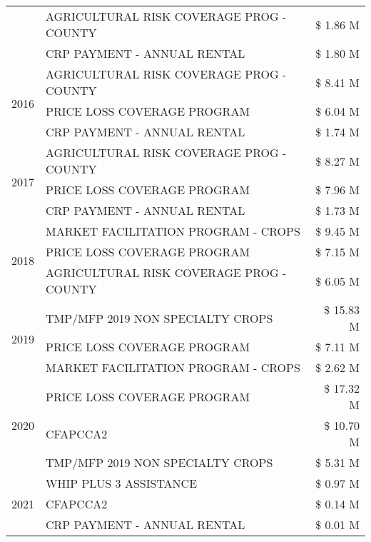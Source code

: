 \begin{tabular}{llr}
 & AGRICULTURAL RISK COVERAGE PROG - COUNTY & \$ 1.86 M \\
 & CRP PAYMENT - ANNUAL RENTAL & \$ 1.80 M \\
\cline{1-3}
\multirow[t]{3}{*}{2016} & AGRICULTURAL RISK COVERAGE PROG - COUNTY & \$ 8.41 M \\
 & PRICE LOSS COVERAGE PROGRAM & \$ 6.04 M \\
 & CRP PAYMENT - ANNUAL RENTAL & \$ 1.74 M \\
\cline{1-3}
\multirow[t]{3}{*}{2017} & AGRICULTURAL RISK COVERAGE PROG - COUNTY & \$ 8.27 M \\
 & PRICE LOSS COVERAGE PROGRAM & \$ 7.96 M \\
 & CRP PAYMENT - ANNUAL RENTAL & \$ 1.73 M \\
\cline{1-3}
\multirow[t]{3}{*}{2018} & MARKET FACILITATION PROGRAM - CROPS & \$ 9.45 M \\
 & PRICE LOSS COVERAGE PROGRAM & \$ 7.15 M \\
 & AGRICULTURAL RISK COVERAGE PROG - COUNTY & \$ 6.05 M \\
\cline{1-3}
\multirow[t]{3}{*}{2019} & TMP/MFP 2019 NON SPECIALTY CROPS & \$ 15.83 M \\
 & PRICE LOSS COVERAGE PROGRAM & \$ 7.11 M \\
 & MARKET FACILITATION PROGRAM - CROPS & \$ 2.62 M \\
\cline{1-3}
\multirow[t]{3}{*}{2020} & PRICE LOSS COVERAGE PROGRAM & \$ 17.32 M \\
 & CFAPCCA2 & \$ 10.70 M \\
 & TMP/MFP 2019 NON SPECIALTY CROPS & \$ 5.31 M \\
\cline{1-3}
\multirow[t]{3}{*}{2021} & WHIP PLUS 3 ASSISTANCE & \$ 0.97 M \\
 & CFAPCCA2 & \$ 0.14 M \\
 & CRP PAYMENT - ANNUAL RENTAL & \$ 0.01 M \\
\cline{1-3}
\bottomrule
\end{tabular}
